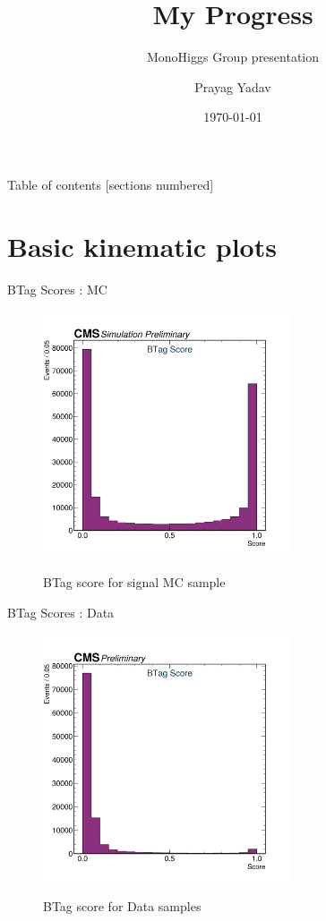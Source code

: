 \documentclass[10pt,xcolor=dvipsnames]{beamer}
\title{My Progress}
\subtitle{MonoHiggs Group presentation}
\date{\today}
\author{Prayag Yadav}
\institute{University of Hyderabad}
\begin{document}
\maketitle

\begin{frame}{Table of contents}
  [sections numbered]
  \tableofcontents%
\end{frame}

\section[Basic kinematic plots without selections, corrections and Scale Factors ]{Basic kinematic plots }

\begin{frame}[fragile]{BTag Scores : MC }
\begin{figure}
  \centering
  \includegraphics[width=0.65\textwidth]{../Kinematics/TagMC.png}
  \label{TagMC}
  \caption{BTag score for signal MC sample}
\end{figure}  
\end{frame}

\begin{frame}[fragile]{BTag Scores : Data}

  \begin{figure}
    \centering
    \includegraphics[width=0.65\textwidth]{../Kinematics/TagData.png}
    \label{TagData}
    \caption{BTag score for Data samples}
  \end{figure}  

\end{frame}
\end{document}
